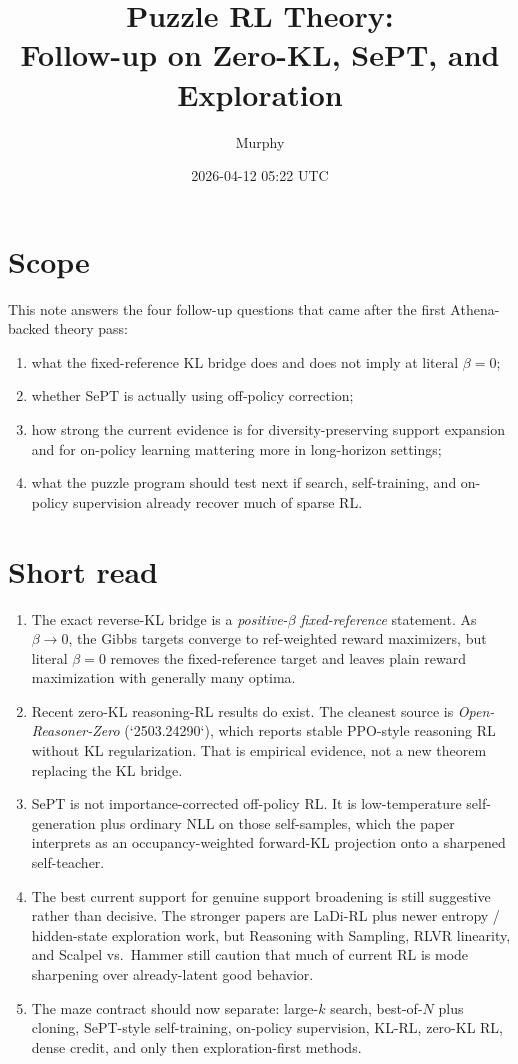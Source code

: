 \documentclass[11pt]{article}
\title{Puzzle RL Theory:\\Follow-up on Zero-KL, SePT, and Exploration}
\author{Murphy}
\date{2026-04-12 05:22 UTC}
\begin{document}
\maketitle

\section*{Scope}

This note answers the four follow-up questions that came after the first Athena-backed theory pass:

\begin{enumerate}
\item what the fixed-reference KL bridge does and does not imply at literal $\beta = 0$;
\item whether SePT is actually using off-policy correction;
\item how strong the current evidence is for diversity-preserving support expansion and for on-policy learning mattering more in long-horizon settings;
\item what the puzzle program should test next if search, self-training, and on-policy supervision already recover much of sparse RL.
\end{enumerate}

\section*{Short read}

\begin{enumerate}
\item The exact reverse-KL bridge is a \emph{positive-$\beta$ fixed-reference} statement. As $\beta \to 0$, the Gibbs targets converge to ref-weighted reward maximizers, but literal $\beta = 0$ removes the fixed-reference target and leaves plain reward maximization with generally many optima.
\item Recent zero-KL reasoning-RL results do exist. The cleanest source is \emph{Open-Reasoner-Zero} (`2503.24290`), which reports stable PPO-style reasoning RL without KL regularization. That is empirical evidence, not a new theorem replacing the KL bridge.
\item SePT is not importance-corrected off-policy RL. It is low-temperature self-generation plus ordinary NLL on those self-samples, which the paper interprets as an occupancy-weighted forward-KL projection onto a sharpened self-teacher.
\item The best current support for genuine support broadening is still suggestive rather than decisive. The stronger papers are LaDi-RL plus newer entropy / hidden-state exploration work, but Reasoning with Sampling, RLVR linearity, and Scalpel vs.\ Hammer still caution that much of current RL is mode sharpening over already-latent good behavior.
\item The maze contract should now separate: large-$k$ search, best-of-$N$ plus cloning, SePT-style self-training, on-policy supervision, KL-RL, zero-KL RL, dense credit, and only then exploration-first methods.
\end{enumerate}
\end{document}
